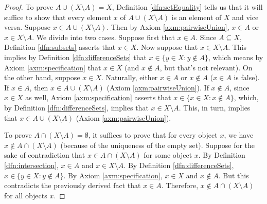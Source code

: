\documentclass[../main.tex]{subfiles}
\begin{document}
\begin{enumerate}[ref={\thesection.\arabic*}]
\begin{prp}
\begin{enumerate}[label={\textup{(}\alph*\textup{)}}]
\begin{proof}
                To prove $A\cup(X\setminus A)=X$, Definition \ref{dfn:setEquality} tells us that it will suffice to show that every element $x$ of $A\cup(X\setminus A)$ is an element of $X$ and vice versa. Suppose $x\in A\cup(X\setminus A)$. Then by Axiom \ref{axm:pairwiseUnion}, $x\in A$ or $x\in X\setminus A$. We divide into two cases. Suppose first that $x\in A$. Since $A\subseteq X$, Definition \ref{dfn:subsets} asserts that $x\in X$. Now suppose that $x\in X\setminus A$. This implies by Definition \ref{dfn:differenceSets} that $x\in\{y\in X:y\notin A\}$, which means by Axiom \ref{axm:specification} that $x\in X$ (and $x\notin A$, but that's not relevant). On the other hand, suppose $x\in X$. Naturally, either $x\in A$ or $x\notin A$ ($x\in A$ is false). If $x\in A$, then $x\in A\cup(X\setminus A)$ (Axiom \ref{axm:pairwiseUnion}). If $x\notin A$, since $x\in X$ as well, Axiom \ref{axm:specification} asserts that $x\in\{x\in X:x\notin A\}$, which, by Definition \ref{dfn:differenceSets}, implies that $x\in X\setminus A$. This, in turn, implies that $x\in A\cup(X\setminus A)$ (Axiom \ref{axm:pairwiseUnion}).\par
                To prove $A\cap(X\setminus A)=\emptyset$, it suffices to prove that for every object $x$, we have $x\notin A\cap(X\setminus A)$ (because of the uniqueness of the empty set). Suppose for the sake of contradiction that $x\in A\cap(X\setminus A)$ for some object $x$. By Definition \ref{dfn:intersection}, $x\in A$ and $x\in X\setminus A$. By Definition \ref{dfn:differenceSets}, $x\in\{y\in X:y\notin A\}$. By Axiom \ref{axm:specification}, $x\in X$ and $x\notin A$. But this contradicts the previously derived fact that $x\in A$. Therefore, $x\notin A\cap(X\setminus A)$ for all objects $x$.

\end{proof}
\end{enumerate}
\end{prp}
\end{enumerate}
\end{document}
